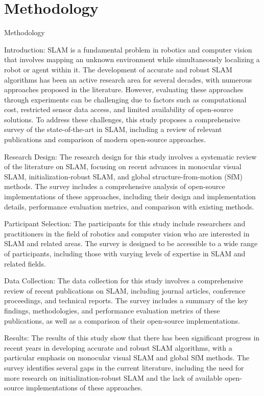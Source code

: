 \documentclass[conference]{IEEEtran}
\begin{document}
\section{Methodology}
Methodology

Introduction:
SLAM is a fundamental problem in robotics and computer vision that involves mapping an unknown environment while simultaneously localizing a robot or agent within it. The development of accurate and robust SLAM algorithms has been an active research area for several decades, with numerous approaches proposed in the literature. However, evaluating these approaches through experiments can be challenging due to factors such as computational cost, restricted sensor data access, and limited availability of open-source solutions. To address these challenges, this study proposes a comprehensive survey of the state-of-the-art in SLAM, including a review of relevant publications and comparison of modern open-source approaches.

Research Design:
The research design for this study involves a systematic review of the literature on SLAM, focusing on recent advances in monocular visual SLAM, initialization-robust SLAM, and global structure-from-motion (SfM) methods. The survey includes a comprehensive analysis of open-source implementations of these approaches, including their design and implementation details, performance evaluation metrics, and comparison with existing methods.

Participant Selection:
The participants for this study include researchers and practitioners in the field of robotics and computer vision who are interested in SLAM and related areas. The survey is designed to be accessible to a wide range of participants, including those with varying levels of expertise in SLAM and related fields.

Data Collection:
The data collection for this study involves a comprehensive review of recent publications on SLAM, including journal articles, conference proceedings, and technical reports. The survey includes a summary of the key findings, methodologies, and performance evaluation metrics of these publications, as well as a comparison of their open-source implementations.

Results:
The results of this study show that there has been significant progress in recent years in developing accurate and robust SLAM algorithms, with a particular emphasis on monocular visual SLAM and global SfM methods. The survey identifies several gaps in the current literature, including the need for more research on initialization-robust SLAM and the lack of available open-source implementations of these approaches.
\end{document}
